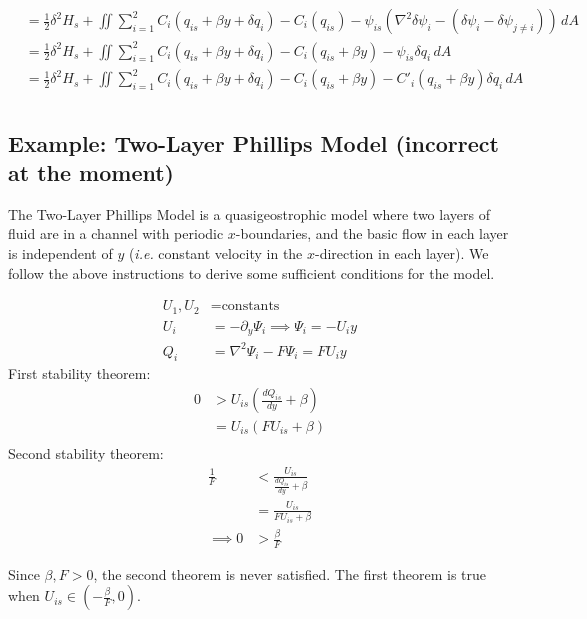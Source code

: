 \documentclass[12pt]{article}
\begin{document}
{{\begin{align*}
            &= \frac12 \delta^2 H_s + \iint \sum_{i=1}^2 C_i(q_{is} + \beta y + \delta q_i) - C_i(q_{is}) - \psi_{is}(\nabla^2\delta\psi_i - (\delta\psi_i - \delta\psi_{j \ne i})) \, dA \\
            &= \frac12 \delta^2 H_s + \iint \sum_{i=1}^2 C_i(q_{is} + \beta y + \delta q_i) - C_i(q_{is} + \beta y) - \psi_{is}\delta q_i \, dA \\
            &= \frac12 \delta^2 H_s + \iint \sum_{i=1}^2 C_i(q_{is} + \beta y + \delta q_i) - C_i(q_{is} + \beta y) - C'_i(q_{is} + \beta y)\delta q_i \, dA \\
        \end{align*}
    }
    \subsection{Example: Two-Layer Phillips Model (incorrect at the moment)}{
        The Two-Layer Phillips Model is a quasigeostrophic model where two layers of fluid are in a channel with periodic $x$-boundaries, and the basic flow in each layer is independent of $y$ (\emph{i.e.} constant velocity in the $x$-direction in each layer). We follow the above instructions to derive some sufficient conditions for the model.

        \begin{align*}
            U_1, U_2 &= \text{constants} \\
            U_i &= -\partial_y \Psi_i \implies \Psi_i = -U_i y \\
            Q_i &= \nabla^2\Psi_i - F\Psi_i = F U_i y
        \end{align*}
        First stability theorem:
        \begin{align*}
            0 &> U_{is} \left(\frac{d Q_{is}}{dy} + \beta \right) \\
            &= U_{is} (F U_{is} + \beta) \\
        \end{align*}
        Second stability theorem:
        \begin{align*}
            \frac1F &< \frac{U_{is}}{\frac{d Q_{is}}{dy} + \beta} \\
            &= \frac{U_{is}}{F U_{is} + \beta} \\
            \implies 0 &> \frac{\beta}{F}
        \end{align*}

        Since $\beta, F > 0$, the second theorem is never satisfied. The first theorem is true when $U_{is} \in (-\frac{\beta}{F}, 0)$.
    }   
}
\end{document}
